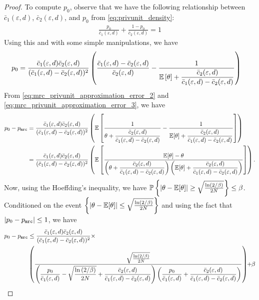 \begin{proof}
To compute $p_0$, observe that we have the following relationship between $ \bar{c}_1(\varepsilon, d)$, $ \bar{c}_2(\varepsilon, d)$, and $p_0$ from \eqref{eq:privunit_density}:
\begin{align}
    \frac{ p_0}{\bar{c}_1(\varepsilon, d)} + \frac{ 1-p_0}{\bar{c}_2(\varepsilon, d)} = 1 \label{eq:c1c2p}
\end{align}
Using this and with some simple manipulations, we have 
\begin{align}
p_0
& = \frac{ \bar{c}_1(\varepsilon, d) \bar{c}_2(\varepsilon, d)}{( \bar{c}_1(\varepsilon, d)- \bar{c}_2(\varepsilon, d))^2} \left(\frac{ \bar{c}_1(\varepsilon, d)- \bar{c}_2(\varepsilon, d)}{ \bar{c}_2(\varepsilon, d)}-\frac{1}{\mathbb{E}\left[ \theta \right]+\dfrac{ \bar{c}_2(\varepsilon, d)}{ \bar{c}_1(\varepsilon, d)- \bar{c}_2(\varepsilon, d)}}\right) \label{eq:mrc_privunit_approximation_error_3}
\end{align}
From \eqref{eq:mrc_privunit_approximation_error_2} and \eqref{eq:mrc_privunit_approximation_error_3}, we have
\begin{align}
    p_0 - p_{\texttt{mrc}} 
    &= \frac{ \bar{c}_1(\varepsilon, d) \bar{c}_2(\varepsilon, d)}{( \bar{c}_1(\varepsilon, d)- \bar{c}_2(\varepsilon, d))^2} \left( \mathbb{E}\left[ \frac{1}{\theta+\dfrac{ \bar{c}_2(\varepsilon, d)}{ \bar{c}_1(\varepsilon, d)- \bar{c}_2(\varepsilon, d)}} - \frac{1}{\mathbb{E}[\theta]+\dfrac{ \bar{c}_2(\varepsilon, d)}{ \bar{c}_1(\varepsilon, d)- \bar{c}_2(\varepsilon, d)}} \right] \right)\\
    & = \frac{ \bar{c}_1(\varepsilon, d) \bar{c}_2(\varepsilon, d)}{( \bar{c}_1(\varepsilon, d)- \bar{c}_2(\varepsilon, d))^2} \left( \mathbb{E}\left[ \frac{\mathbb{E}[\theta]-\theta}{\left( \theta+\dfrac{ \bar{c}_2(\varepsilon, d)}{ \bar{c}_1(\varepsilon, d)- \bar{c}_2(\varepsilon, d)} \right) \left( \mathbb{E}[\theta]+\dfrac{ \bar{c}_2(\varepsilon, d)}{ \bar{c}_1(\varepsilon, d)- \bar{c}_2(\varepsilon, d)} \right)} \right] \right).
\end{align} 
Now, using the Hoeffding's inequality, we have $\mathbb{P}\left\{ \left\lvert \theta - \mathbb{E}[\theta] \right\rvert \geq \sqrt{\frac{\ln \left( 2/\beta \right)}{2N}} \right\} \leq \beta$. Conditioned on the event $\left\{ \left\lvert \theta - \mathbb{E}[\theta] \right\rvert \leq \sqrt{\frac{\ln \left( 2/\beta \right)}{2N}} \right\}$ and using the fact that $\left\lvert p_0 - p_{\texttt{mrc}}\right\rvert\leq 1$, we have
\begin{align}
    p_0   -   p_{\texttt{mrc}}  &  \leq   \dfrac{ \bar{c}_1(\varepsilon, d) \bar{c}_2(\varepsilon, d)}{( \bar{c}_1(\varepsilon, d)   -   \bar{c}_2(\varepsilon, d))^2}  \times \\
    & \lp \frac{\sqrt{\frac{\ln \lp 2/\beta \rp}{2N}}}{\lp \dfrac{p_0}{ \bar{c}_1(\varepsilon, d)}   -   \sqrt{\dfrac{\ln \lp 2/\beta \rp}{2N}}   +   \dfrac{ \bar{c}_2(\varepsilon, d)}{ \bar{c}_1(\varepsilon, d)   -   \bar{c}_2(\varepsilon, d)} \rp \lp \dfrac{p_0}{ \bar{c}_1(\varepsilon, d)}   +  \dfrac{ \bar{c}_2(\varepsilon, d)}{ \bar{c}_1(\varepsilon, d)   -   \bar{c}_2(\varepsilon, d)} \rp} \rp \hspace{-1mm} + \hspace{-1mm} \beta \label{eq:mrc_privunit_approximation_error_4}

\end{align}
\end{proof}
